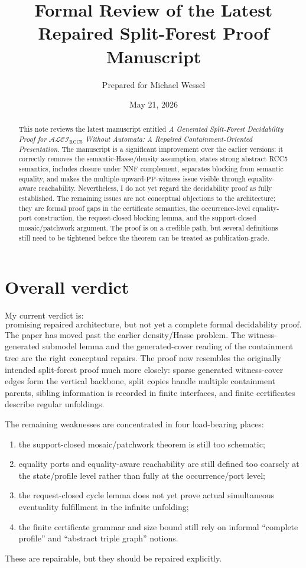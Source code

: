 \documentclass[11pt]{article}
\title{Formal Review of the Latest Repaired Split-Forest Proof Manuscript}
\author{Prepared for Michael Wessel}
\date{May 21, 2026}
\newcommand{\ALCIRCC}{\mathcal{ALCI}_{\mathrm{RCC5}}}
\newcommand{\PP}{\mathrm{PP}}
\begin{document}
\maketitle

\begin{abstract}
This note reviews the latest manuscript entitled \emph{A Generated Split-Forest Decidability Proof for \(\ALCIRCC\) Without Automata: A Repaired Containment-Oriented Presentation}.  The manuscript is a significant improvement over the earlier versions: it correctly removes the semantic-Hasse/density assumption, states strong abstract RCC5 semantics, includes closure under NNF complement, separates blocking from semantic equality, and makes the multiple-upward-\(\PP\)-witness issue visible through equality-aware reachability.  Nevertheless, I do not yet regard the decidability proof as fully established.  The remaining issues are not conceptual objections to the architecture; they are formal proof gaps in the certificate semantics, the occurrence-level equality-port construction, the request-closed blocking lemma, and the support-closed mosaic/patchwork argument.  The proof is on a credible path, but several definitions still need to be tightened before the theorem can be treated as publication-grade.
\end{abstract}

\section{Overall verdict}

My current verdict is:
\[
\boxed{\text{promising repaired architecture, but not yet a complete formal decidability proof.}}
\]
The paper has moved past the earlier density/Hasse problem.  The witness-generated submodel lemma and the generated-cover reading of the containment tree are the right conceptual repairs.  The proof now resembles the originally intended split-forest proof much more closely: sparse generated witness-cover edges form the vertical backbone, split copies handle multiple containment parents, sibling information is recorded in finite interfaces, and finite certificates describe regular unfoldings.

The remaining weaknesses are concentrated in four load-bearing places:
\begin{enumerate}[label=(G\arabic*),leftmargin=*]
\item the support-closed mosaic/patchwork theorem is still too schematic;
\item equality ports and equality-aware reachability are still defined too coarsely at the state/profile level rather than fully at the occurrence/port level;
\item the request-closed cycle lemma does not yet prove actual simultaneous eventuality fulfillment in the infinite unfolding;
\item the finite certificate grammar and size bound still rely on informal ``complete profile'' and ``abstract triple graph'' notions.
\end{enumerate}
These are repairable, but they should be repaired explicitly.
\end{document}
